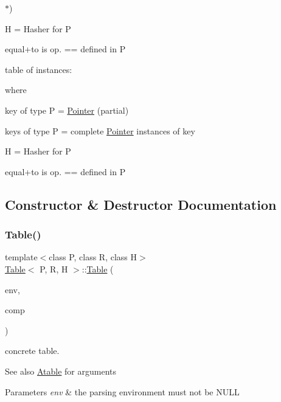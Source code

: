 $\ast$)
\begin{DoxyItemize}
\item H = Hasher for P
\item equal+to is op. == defined in P
\end{DoxyItemize}

table of instances\+: 
\begin{DoxyCode}{0}
\end{DoxyCode}
 where
\begin{DoxyItemize}
\item key of type P = \mbox{\hyperlink{classPointer}{Pointer}} (partial)
\item keys of type P = complete \mbox{\hyperlink{classPointer}{Pointer}} instances of key
\item H = Hasher for P
\item equal+to is op. == defined in P 
\end{DoxyItemize}

\subsection{Constructor \& Destructor Documentation}
\mbox{\label{classTable_a75c05943dcc9afb9ee0af010143a692e}} 
\subsubsection{\texorpdfstring{Table()}{Table()}}
{\footnotesize\ttfamily template$<$class P, class R, class H$>$ \\
\mbox{\hyperlink{classTable}{Table}}$<$ P, R, H $>$\+::\mbox{\hyperlink{classTable}{Table}} (\begin{DoxyParamCaption}\item[{\mbox{\hyperlink{classParser}{Parser}}$<$ P $>$ $\ast$}]{env,  }\item[{Run\+Compare$<$ P $>$}]{comp }\end{DoxyParamCaption})}



concrete table. 

\begin{DoxySeeAlso}{See also}
\mbox{\hyperlink{classAtable}{Atable}} for arguments 
\end{DoxySeeAlso}

\begin{DoxyParams}{Parameters}
{\em env} & the parsing environment must not be N\+U\+LL \\
\hline
\end{DoxyParams}


